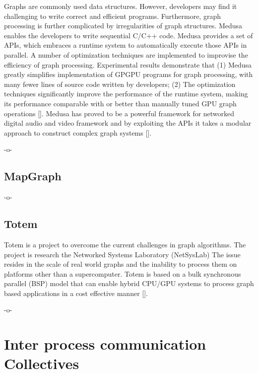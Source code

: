 Graphs are commonly used data structures. However, developers may find
it challenging to write correct and efficient programs. Furthermore,
graph processing is further complicated by irregularities of graph
structures. Medusa enables the developers to write sequential C/C++
code. Medusa provides a set of APIs, which embraces a runtime system
to automatically execute those APIs in parallel\cite{paper_medusa}.  A
number of optimization techniques are implemented to improvise the
efficiency of graph processing. Experimental results demonstrate that
(1) Medusa greatly simplifies implementation of GPGPU programs for
graph processing, with many fewer lines of source code written by
developers; (2) The optimization techniques significantly improve the
performance of the runtime system, making its performance comparable
with or better than manually tuned GPU graph
operations [\cite{paper_medusa}]. Medusa has proved to be a powerful
framework for networked digital audio and video framework and by
exploiting the APIs it takes a modular approach to construct complex
graph systems [\cite{www-medusa}].

     -o-

\subsection{MapGraph}

-o- 

\subsection{Totem}

Totem is a project to overcome the current challenges in graph
algorithms.  The project is research the Networked Systems Laboratory
(NetSysLab) The issue resides in the scale of real world graphs and
the inability to process them on platforms other than a supercomputer.
Totem is based on a bulk synchronous parallel (BSP) model that can
enable hybrid CPU/GPU systems to process graph based applications in a
cost effective manner [\cite{www-netsyslab}].

     -o-


\section{Inter process communication Collectives}
\label{S:o-process-communication}


